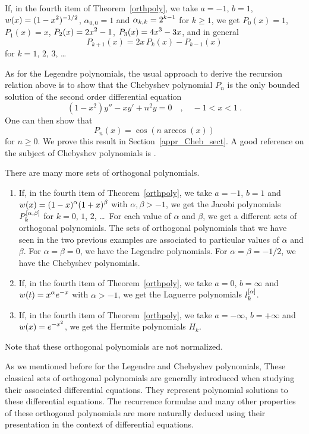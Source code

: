 \begin{egg}
If, in the fourth item of Theorem~\ref{orthpoly}, we take $a=-1$,
$b=1$, $\displaystyle w(x)=(1-x^2)^{-1/2}$, $\alpha_{0,0} = 1$ and
$\displaystyle \alpha_{k,k} = 2^{k-1}$ for
$k\geq 1$, we get $P_0(x) = 1$, $P_1(x) = x$, $\displaystyle P_2(x) = 2x^2 -1$,
$\displaystyle P_3(x) = 4x^3 -3x$, and in general
\[
  P_{k+1}(x) = 2x\,P_k(x) - P_{k-1}(x)
\]
for $k=1$, $2$, $3$, \ldots
\label{appr_cheb_egg}

As for the Legendre polynomials, the usual approach to derive the
recursion relation above is to show that the Chebyshev polynomial $P_n$
is the only bounded solution of the 
second order differential equation
\[
  (1-x^2) y'' - xy' + n^2 y = 0 \quad , \quad -1 < x < 1 \ .
\]
One can then show that
\[
  P_n(x) = \cos(n \arccos(x))
\]
for $n \geq 0$.  We prove this result in Section~\ref{appr_Cheb_sect}.
A good reference on the subject of Chebyshev polynomials is \cite{GS}.
\end{egg}

\begin{egg}
There are many more sets of orthogonal polynomials. 
\begin{enumerate}
\item If, in the fourth item of Theorem~\ref{orthpoly}, we take
$a=-1$, $b=1$ and $\displaystyle w(x) = (1-x)^\alpha (1+x)^\beta$ with
$\alpha,\beta>-1$, we get the Jacobi polynomials
$\displaystyle P_k^{[\alpha,\beta]}$ for $k=0$, $1$, $2$, \ldots\   For each
value of $\alpha$ and $\beta$, we get a different sets of orthogonal
polynomials.   The sets of orthogonal polynomials that we have
seen in the two previous examples are associated to particular values
of $\alpha$ and $\beta$.  For $\alpha = \beta = 0$, we have the
Legendre polynomials.  For $\alpha = \beta = -1/2$, we have the
Chebyshev polynomials.
\item If, in the fourth item of Theorem~\ref{orthpoly}, we take $a=0$,
$b=\infty$ and $\displaystyle w(t) = x^\alpha e^{-x}$ with $\alpha > -1$,
we get the Laguerre polynomials $\displaystyle l_k^{[\alpha]}$. 
\item If, in the fourth item of Theorem~\ref{orthpoly}, we take
$a=-\infty$, $b=+\infty$ and $\displaystyle w(x) = e^{-x^2}$, we get the 
Hermite polynomials $H_k$.
\end{enumerate}
Note that these orthogonal polynomials are not normalized.

As we mentioned before for the Legendre and Chebyshev polynomials,
These classical sets of orthogonal polynomials are generally introduced
when studying their associated differential equations.  They
represent polynomial solutions to these differential equations.  The
recurrence formulae and many other properties of these orthogonal
polynomials are more naturally deduced using their presentation in the
context of differential equations.
\end{egg}

